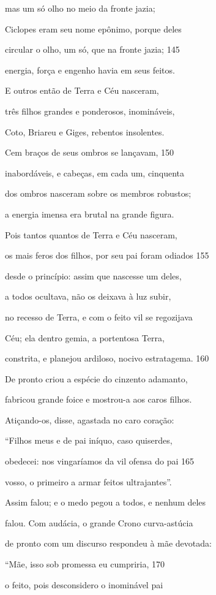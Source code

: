 mas um só olho no meio da fronte jazia;

Ciclopes eram seu nome epônimo, porque deles

circular o olho, um só, que na fronte jazia; \num{145}

energia, força e engenho havia em seus feitos.

\quad{}E outros então de Terra e Céu nasceram,

três filhos grandes e ponderosos, inomináveis,

Coto, Briareu e Giges, rebentos insolentes.

Cem braços de seus ombros se lançavam, \num{150}

inabordáveis, e cabeças, em cada um, cinquenta

dos ombros nasceram sobre os membros robustos;

a energia imensa era brutal na grande figura.

\quad{}Pois tantos quantos de Terra e Céu nasceram,

os mais feros dos filhos, por seu pai foram odiados \num{155}

desde o princípio: assim que nascesse um deles,

a todos ocultava, não os deixava à luz subir,

no recesso de Terra, e com o feito vil se regozijava

Céu; ela dentro gemia, a portentosa Terra,

constrita, e planejou ardiloso, nocivo estratagema. \num{160}

De pronto criou a espécie do cinzento adamanto,

fabricou grande foice e mostrou-a aos caros filhos.

\quad{}Atiçando-os, disse, agastada no caro coração:

``Filhos meus e de pai iníquo, caso quiserdes,

obedecei: nos vingaríamos da vil ofensa do pai \num{165}

vosso, o primeiro a armar feitos ultrajantes''.

\quad{}Assim falou; e o medo pegou a todos, e nenhum deles

falou. Com audácia, o grande Crono curva-astúcia

de pronto com um discurso respondeu à mãe devotada:

``Mãe, isso sob promessa eu cumpriria, \num{170}

o feito, pois desconsidero o inominável pai

